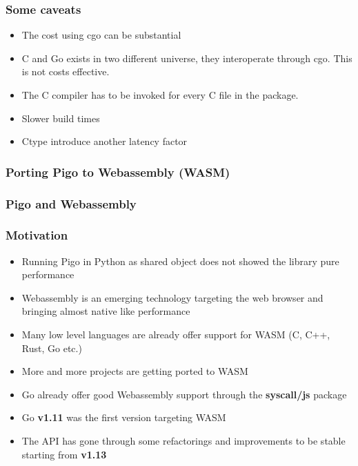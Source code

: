 \documentclass[9pt]{beamer}
\begin{document}
\begin{frame}[fragile]
\frametitle{Some caveats}


\begin{itemize}
\item The cost using cgo can be substantial
\item C and Go exists in two different universe, they interoperate through cgo. This is not costs effective.
\item The C compiler has to be invoked for every C file in the package.
\item Slower build times
\item Ctype introduce another latency factor
\end{itemize}


\end{frame}

\begin{frame}[fragile]
\frametitle{Porting Pigo to Webassembly (WASM)}


\end{frame}

\begin{frame}[fragile]
\frametitle{Pigo and Webassembly}


\end{frame}

\begin{frame}[fragile]
\frametitle{Motivation}


\begin{itemize}
\item Running Pigo in Python as shared object does not showed the library pure performance
\item Webassembly is an emerging technology targeting the web browser and bringing almost native like performance
\item Many low level languages are already offer support for WASM (C, C++, Rust, Go etc.)
\item More and more projects are getting ported to WASM
\item Go already offer good Webassembly support through the \textbf{syscall/js} package
\item Go \textbf{v1.11} was the first version targeting WASM
\item The API has gone through some refactorings and improvements to be stable starting from \textbf{v1.13}
\end{itemize}


\end{frame}
\end{document}
